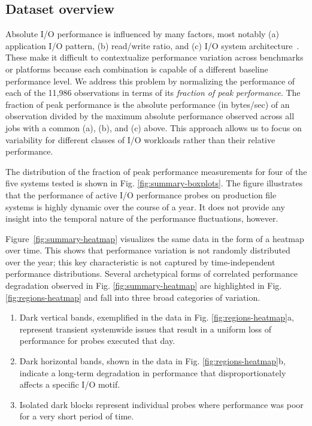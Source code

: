 \subsection{Dataset overview} \label{sec:features/summary}

Absolute I/O performance is influenced by many factors, most notably (a)
application I/O pattern, (b) read/write ratio, and (c) I/O system
architecture~\cite{Lockwood2017, Xie2012}.  These make it difficult to
contextualize performance variation across benchmarks or platforms
because each combination is capable of a different baseline performance
level.
We address this problem by normalizing the
performance of each of the 11,986 observations in terms of its
\emph{fraction of peak performance}.
The fraction of peak performance is the absolute performance (in
bytes/sec) of an observation divided by the maximum absolute performance
observed across all jobs with a common (a), (b), and (c) above.
This
approach allows us to focus on variability for different classes of I/O
workloads rather than their relative performance.


The distribution of the fraction of peak performance measurements for four
of the five systems tested is shown in Fig. \ref{fig:summary-boxplots}.
The figure illustrates that the performance of active I/O performance
probes on production file systems is highly dynamic over the course of a
year.  It does not provide any insight into the temporal nature of the
performance fluctuations, however.

Figure~\ref{fig:summary-heatmap} visualizes the same data in the form of a
heatmap over time.  This shows that performance variation is not randomly
distributed over the year; this key characteristic is not captured by
time-independent performance distributions.
Several archetypical forms of correlated performance degradation observed in Fig. \ref{fig:summary-heatmap} are highlighted in Fig. \ref{fig:regions-heatmap} and fall into three broad categories of variation.

\begin{enumerate}[leftmargin=*]
\item Dark vertical bands, exemplified in the \mira data in Fig. \ref{fig:regions-heatmap}a, represent transient systemwide issues that result in a uniform loss of performance for probes executed that day.
\item Dark horizontal bands, shown in the \cori data in Fig. \ref{fig:regions-heatmap}b, indicate a long-term degradation in performance that disproportionately affects a specific I/O motif.
\item Isolated dark blocks represent individual probes where performance was poor for a very short period of time.
\end{enumerate}

